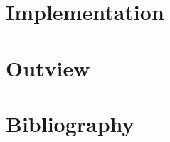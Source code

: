 \documentclass[10pt,a4paper]{article}
\begin{document}
\normalsize

\section{Implementation}
\section{Outview}
\section{Bibliography}
 

\end{document}
